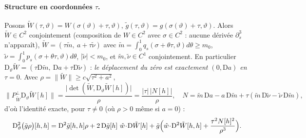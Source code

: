 \documentclass[11pt,a4paper]{article}
\theoremstyle{remark}
\newcommand{\vth}{\vartheta}
\newcommand{\D}{\mathrm D}
\begin{document}
\paragraph{Structure en coordonnées $\tau$.} Posons $\tilde W(\tau,\vth)=W(\sigma(\vth)+\tau,\vth)$, $\tilde g(\tau,\vth)=g(\sigma(\vth)+\tau,\vth)$. Alors $\tilde W\in C^2$ conjointement (composition de $W\in C^2$ avec $\sigma\in C^2$ : aucune dérivée $\partial_s^3$ n'apparaît), $\tilde W=(\tau\tilde m,\ a+\tau\tilde\nu)$ avec $\tilde m=\int_0^1q_s(\sigma+\theta\tau,\vth)d\theta\ge m_0$, $\tilde\nu=\int_0^1p_s(\sigma+\theta\tau,\vth)d\theta$, $\lvert\tilde\nu\rvert<m_0$, et $\tilde m,\tilde\nu\in C^1$ conjointement. En particulier $\D_\vth\tilde W=(\tau\D\tilde m,\ \D a+\tau\D\tilde\nu)$ : \emph{le déplacement du zéro est exactement $(0,\D a)$ en $\tau=0$}. Avec $\rho=\lVert\tilde W\rVert\ge c\sqrt{\tau^2+a^2}$,
\[
\lVert P^\perp_{\tilde W}\D_\vth\tilde W[h]\rVert=\frac{\lvert\det(\tilde W,\D_\vth\tilde W[h])\rvert}{\rho}=\frac{\lvert\tau\rvert\,\lvert N[h]\rvert}{\rho},\quad N=\tilde m\,\D a-a\,\D\tilde m+\tau(\tilde m\,\D\tilde\nu-\tilde\nu\,\D\tilde m),
\]
d'où l'identité exacte, pour $\tau\ne0$ (où $\rho>0$ même si $a=0$) :
\begin{equation}\label{eq:hess}
\D^2_\vth\bigl(\tilde g\rho\bigr)[h,h]=\D^2\tilde g[h,h]\rho+2\,\D\tilde g[h]\ \hat w\!\cdot\!\D\tilde W[h]+\tilde g\Bigl(\hat w\!\cdot\!\D^2\tilde W[h,h]+\frac{\tau^2N[h]^2}{\rho^3}\Bigr).
\end{equation}
\end{document}
